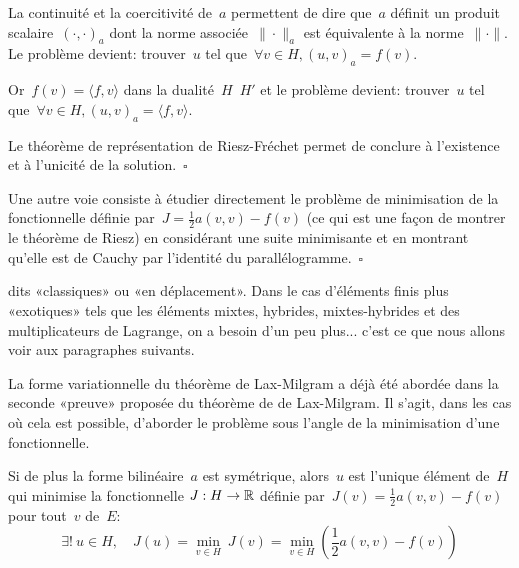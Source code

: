 \medskip
\begin{demonstration}\footnotesize{}
La continuité et la coercitivité de~$a$ permettent de dire que~$a$ définit un produit scalaire~$(\cdot,\cdot)_a$ dont la norme associée~$\|\cdot\|_a$ est équivalente à la norme~$\|\cdot\|$. 
Le problème devient: trouver~$u$ tel que~$\forall v\in H, (u,v)_a=f(v)$.

Or~$f(v)=\langle f,v\rangle$ dans la dualité~$H$~$H'$ et le problème devient:
trouver~$u$ tel que~$\forall v\in H, (u,v)_a=\langle f,v\rangle$.

Le théorème de représentation de Riesz-Fréchet permet de conclure à l'existence et à l'unicité de la solution.~$\square$
\end{demonstration}

\begin{demonstration}\footnotesize{}
Une autre voie consiste à étudier directement le problème de minimisation de la fonctionnelle définie par~$J=\tfrac12 a(v,v)-f(v)$ (ce qui est une façon de montrer le théorème de Riesz) en considérant une suite minimisante et en montrant qu'elle est de Cauchy par l'identité du parallélogramme.~$\square$
\end{demonstration}

\medskip
{} dits «classiques» ou «en déplacement». Dans le cas d'éléments finis plus «exotiques» tels que les éléments mixtes, hybrides, mixtes-hybrides et des multiplicateurs de Lagrange, on a besoin d'un peu plus... c'est ce que nous allons voir aux paragraphes suivants.

\medskip
La forme variationnelle du théorème de Lax-Milgram a déjà été abordée dans la seconde «preuve» proposée du théorème de de Lax-Milgram. Il s'agit, dans les cas où cela est possible, d'aborder le problème sous l'angle de la minimisation d'une fonctionnelle.
\medskipvm
\begin{theoreme}
Si de plus la forme bilinéaire~$a$ est symétrique, alors~$u$ est l'unique élément de~$H$ qui minimise la fonctionnelle
$J: H\rightarrow\mathbb R$ définie par~$J(v) = \frac12 a(v,v)-f(v)$ pour tout~$v$ de~$E$:
\begin{equation}
\exists!\ u \in H,\quad J(u) = \min_{v\in H}\ J(v) = \min_{v\in H} \left( \frac12 a(v,v) - f(v) \right)
\end{equation}
\end{theoreme}

